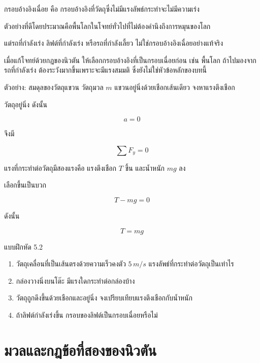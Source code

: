 \begin{tcolorbox}[title=นิยาม]
กรอบอ้างอิงเฉื่อย คือ กรอบอ้างอิงที่วัตถุซึ่งไม่มีแรงลัพธ์กระทำจะไม่มีความเร่ง
\end{tcolorbox}

ตัวอย่างที่ดีโดยประมาณคือพื้นโลกในโจทย์ทั่วไปที่ไม่ต้องคำนึงถึงการหมุนของโลก

แต่รถที่กำลังเร่ง ลิฟต์ที่กำลังเร่ง หรือรถที่กำลังเลี้ยว ไม่ใช่กรอบอ้างอิงเฉื่อยอย่างแท้จริง

\begin{tcolorbox}[title=ข้อควรจำสำหรับ สอวน.]
เมื่อแก้โจทย์ด้วยกฎของนิวตัน ให้เลือกกรอบอ้างอิงที่เป็นกรอบเฉื่อยก่อน เช่น พื้นโลก ถ้าไปมองจากรถที่กำลังเร่ง ต้องระวังมากขึ้นเพราะจะมีแรงสมมติ ซึ่งยังไม่ใช่หัวข้อหลักของบทนี้
\end{tcolorbox}

\begin{examplebox}{ตัวอย่าง: สมดุลของวัตถุแขวน}
วัตถุมวล $m$ แขวนอยู่นิ่งด้วยเชือกเส้นเดียว จงหาแรงตึงเชือก

วัตถุอยู่นิ่ง ดังนั้น

\[
a=0
\]

จึงมี

\[
\sum F_y=0
\]

แรงที่กระทำต่อวัตถุมีสองแรงคือ แรงตึงเชือก $T$ ขึ้น และน้ำหนัก $mg$ ลง

เลือกขึ้นเป็นบวก

\[
T-mg=0
\]

ดังนั้น

\[
\boxed{T=mg}
\]
\end{examplebox}

\begin{exercisebox}{แบบฝึกหัด 5.2}
\begin{enumerate}
    \item วัตถุเคลื่อนที่เป็นเส้นตรงด้วยความเร็วคงตัว $5\,\si{m/s}$ แรงลัพธ์ที่กระทำต่อวัตถุเป็นเท่าไร
    \item กล่องวางนิ่งบนโต๊ะ มีแรงใดกระทำต่อกล่องบ้าง
    \item วัตถุถูกดึงขึ้นด้วยเชือกและอยู่นิ่ง จงเปรียบเทียบแรงตึงเชือกกับน้ำหนัก
    \item ถ้าลิฟต์กำลังเร่งขึ้น กรอบของลิฟต์เป็นกรอบเฉื่อยหรือไม่
\end{enumerate}
\end{exercisebox}

\section{มวลและกฎข้อที่สองของนิวตัน}

